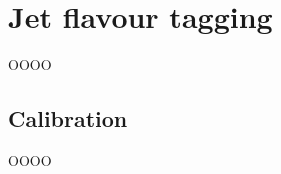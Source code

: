 \section{Jet flavour tagging}
\label{heading:Chapter6-section1-1}

OOOO

\subsection{Calibration}
\label{heading:Chapter6-section1-2}

OOOO

